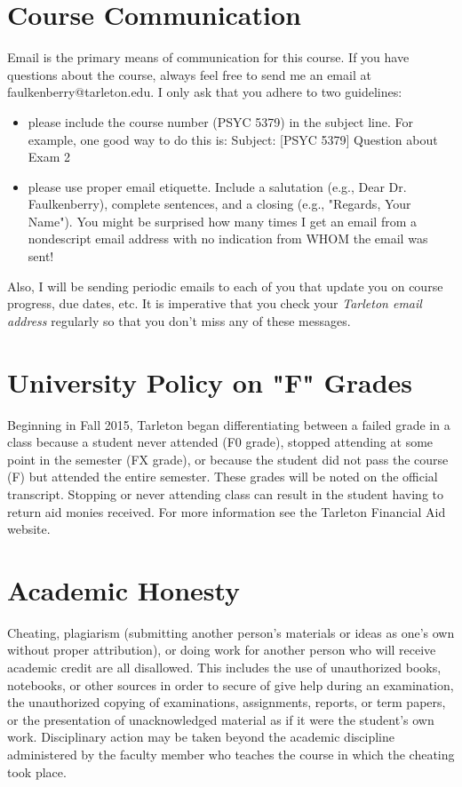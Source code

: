 \documentclass[10pt]{article}
\begin{document}
\section*{Course Communication}
\label{sec:org9b3255e}

Email is the primary means of communication for this course.  If you have questions about the course, always feel free to send me an email at faulkenberry@tarleton.edu.  I only ask that you adhere to two guidelines:
\begin{itemize}
\item please include the course number (PSYC 5379) in the subject line.  For example, one good way to do this is:  Subject: [PSYC 5379] Question about Exam 2
\item please use proper email etiquette.  Include a salutation (e.g., Dear Dr. Faulkenberry), complete sentences, and a closing (e.g., "Regards, Your Name").  You might be surprised how many times I get an email from a nondescript email address with no indication from WHOM the email was sent!
\end{itemize}

Also, I will be sending periodic emails to each of you that update you on course progress, due dates, etc. It is imperative that you check your \emph{Tarleton email address} regularly so that you don't miss any of these messages.

\section*{University Policy on "F" Grades}
\label{sec:org4a0df9e}
Beginning in Fall 2015, Tarleton began differentiating between a failed grade in a class because a student never attended (F0 grade), stopped attending at some point in the semester (FX grade), or because the student did not pass the course (F) but attended the entire semester. These grades will be noted on the official transcript. Stopping or never attending class can result in the student having to return aid monies received.  For more information see the Tarleton Financial Aid website.

\section*{Academic Honesty}
\label{sec:org448f694}

Cheating, plagiarism (submitting another person’s materials or ideas as one’s own without proper attribution), or doing work for another person who will receive academic credit are all disallowed. This includes the use of unauthorized books, notebooks, or other sources in order to secure of give help during an examination, the unauthorized copying of examinations, assignments, reports, or term papers, or the presentation of unacknowledged material as if it were the student’s own work. Disciplinary action may be taken beyond the academic discipline administered by the faculty member who teaches the course in which the cheating took place.
\end{document}
